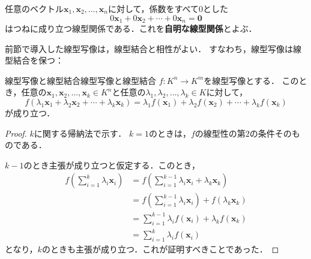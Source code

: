 任意のベクトル$\bm{x}_1, \bm{x}_2, \dots, \bm{x}_n$に対して，係数をすべて$0$とした
\[
  0\bm{x}_1 + 0\bm{x}_2 + \cdots + 0\bm{x}_n = \bm{0}
\]
はつねに成り立つ線型関係である．これを\textbf{自明な線型関係}とよぶ．

前節で導入した線型写像は，線型結合と相性がよい．
すなわち，線型写像は線型結合を保つ：

\begin{prop}{線型写像と線型結合}{線型写像と線型結合}
  $f \colon K^n \to K^m$を線型写像とする．
  このとき，任意の$\bm{x}_1, \bm{x}_2, \dots, \bm{x}_k \in K^n$と任意の$\lambda_1, \lambda_2, \dots, \lambda_k \in K$に対して，
  \[
    f(\lambda_1 \bm{x}_1 + \lambda_2 \bm{x}_2 + \cdots + \lambda_k \bm{x}_k)
    = \lambda_1 f(\bm{x}_1) + \lambda_2 f(\bm{x}_2) + \cdots + \lambda_k f(\bm{x}_k)
  \]
  が成り立つ．
\end{prop}

\begin{leftbar}
\begin{proof}
  $k$に関する帰納法で示す．
  $k = 1$のときは，$f$の線型性の第$2$の条件そのものである．

  $k - 1$のとき主張が成り立つと仮定する．このとき，
  \begin{align}
    f\left(\sum_{i=1}^{k} \lambda_i \bm{x}_i\right)
    &= f\left(\sum_{i=1}^{k-1} \lambda_i \bm{x}_i + \lambda_k \bm{x}_k\right) \nonumber \\
    &= f\left(\sum_{i=1}^{k-1} \lambda_i \bm{x}_i\right) + f(\lambda_k \bm{x}_k) \tag{$f$の線型性} \\
    &= \sum_{i=1}^{k-1} \lambda_i f(\bm{x}_i) + \lambda_k f(\bm{x}_k) \tag{帰納法の仮定と$f$の線型性} \\
    &= \sum_{i=1}^{k} \lambda_i f(\bm{x}_i) \nonumber
  \end{align}
  となり，$k$のときも主張が成り立つ．これが証明すべきことであった．
\end{proof}
\end{leftbar}

